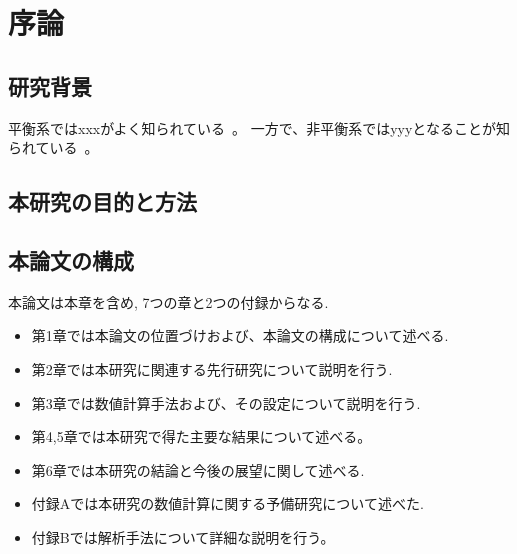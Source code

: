 \documentclass[thesis]{subfiles}
\begin{document}
\chapter{序論}

\section{研究背景}
平衡系ではxxxがよく知られている~\cite{zwanzig2001nonequilibrium}。
一方で、非平衡系ではyyyとなることが知られている~\cite{Widder1989,Stolovitzky1998}。
\section{本研究の目的と方法}

\section{本論文の構成}
本論文は本章を含め, 7つの章と2つの付録からなる.
\begin{itemize}
	\item 第1章では本論文の位置づけおよび、本論文の構成について述べる.
	\item 第2章では本研究に関連する先行研究について説明を行う.
	\item 第3章では数値計算手法および、その設定について説明を行う.
	\item 第4,5章では本研究で得た主要な結果について述べる。
	\item 第6章では本研究の結論と今後の展望に関して述べる.
	\item 付録Aでは本研究の数値計算に関する予備研究について述べた.
	\item 付録Bでは解析手法について詳細な説明を行う。
\end{itemize}
\end{document}
